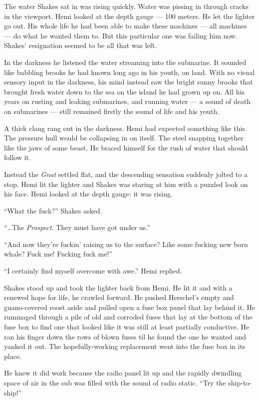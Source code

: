 \documentclass[
]{scrbook}
\begin{document}
The water Shakes sat in was rising quickly. Water was pissing in through
cracks in the viewport. Hemi looked at the depth gauge --- 100 meters.
He let the lighter go out. His whole life he had been able to make these
machines --- all machines --- do what he wanted them to. But this
particular one was failing him now. Shakes' resignation seemed to be all
that was left.

In the darkness he listened the water streaming into the submarine. It
sounded like babbling brooks he had known long ago in his youth, on
land. With no visual sensory input in the darkness, his mind instead saw
the bright sunny brooks that brought fresh water down to the sea on the
island he had grown up on. All his years on rusting and leaking
submarines, and running water --- a sound of death on submarines ---
still remained firstly the sound of life and his youth.

A thick clang rang out in the darkness. Hemi had expected something like
this. The pressure hull would be collapsing in on itself. The steel
snapping together like the jaws of some beast. He braced himself for the
rush of water that should follow it.

Instead the \emph{Gnat} settled flat, and the descending sensation
suddenly jolted to a stop. Hemi lit the lighter and Shakes was staring
at him with a puzzled look on his face. Hemi looked at the depth gauge:
it was rising.

``What the fuck?'' Shakes asked.

``\ldots The \emph{Prospect}. They must have got under us.''

``And now they're fuckin' raising us to the surface? Like some fucking
new born whale? Fuck me! Fucking fuck me!''

``I certainly find myself overcome with awe.'' Hemi replied.

Shakes stood up and took the lighter back from Hemi. He lit it and with
a renewed hope for life, he crawled forward. He pushed Herschel's empty
and guano-covered roost aside and pulled open a fuse box panel that lay
behind it. He rummaged through a pile of old and corroded fuses that lay
at the bottom of the fuse box to find one that looked like it was still
at least partially conductive. He ran his finger down the rows of blown
fuses til he found the one he wanted and yanked it out. The
hopefully-working replacement went into the fuse box in its place.

He knew it did work because the radio panel lit up and the rapidly
dwindling space of air in the sub was filled with the sound of radio
static. ``Try the ship-to-ship!''
\end{document}
